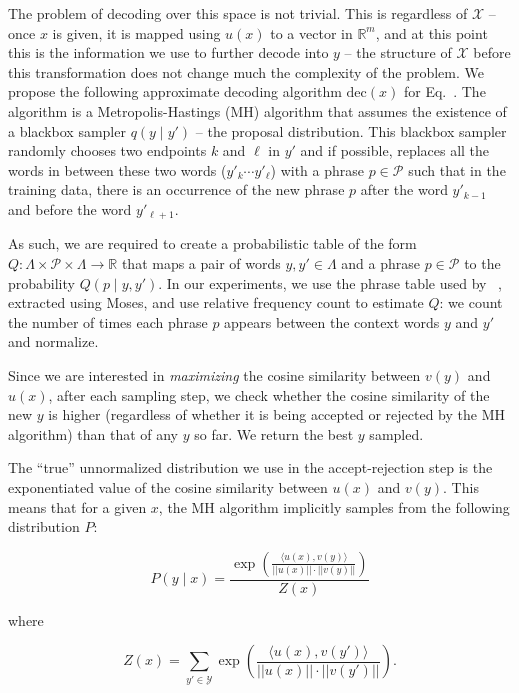 \documentclass[letterpaper]{article}
\newcommand{\inx}{\mathcal{X}}
\newcommand{\outy}{\mathcal{Y}}
\newcommand{\phrasetable}{\mathcal{P}}
\newcommand{\decoder}{\mathrm{dec}}
\newcommand{\newcite}[1]{\citeauthor{#1}~\shortcite{#1}}
\begin{document}
The problem of decoding over this space is not trivial. This is regardless of $\inx$ -- once $x$ is given, it is mapped
using $u(x)$ to a vector in $\mathbb{R}^m$, and at this point this is the information we use to further decode into $y$ --
the structure of $\inx$ before this transformation does not change much the complexity of the problem.
We propose the following approximate decoding algorithm $\decoder(x)$ for Eq.~. The algorithm is a Metropolis-Hastings (MH) algorithm that assumes
the existence of a blackbox sampler $q(y \mid y')$ -- the proposal distribution. This blackbox sampler randomly chooses two endpoints $k$ and $\ell$ in $y'$ and if possible,
replaces all the words in between these two words ($y'_k \cdots y'_{\ell}$) with a phrase $p \in \phrasetable$ such that in the training data, there is an occurrence of the new phrase
$p$ after the word $y'_{k-1}$ and before the word $y'_{\ell+1}$.

As such, we are required to create a probabilistic table of the form $Q \colon \Lambda \times \phrasetable \times \Lambda \rightarrow \mathbb{R}$ that
maps a pair of words $y,y' \in \Lambda$ and a phrase $p \in \phrasetable$ to the probability $Q(p \mid y,y')$. In our experiments, we use the phrase
table used by \newcite{ortiz2015learning}, extracted using Moses, and use relative frequency count to estimate $Q$: we count the number of times each
phrase $p$ appears between the context words $y$ and $y'$ and normalize.

Since we are interested in {\em maximizing} the cosine similarity between $v(y)$ and $u(x)$, after each sampling step, we check whether
the cosine similarity of the new $y$ is higher (regardless of whether it is being accepted or rejected by the MH algorithm) than that of any $y$ so far.
We return the best $y$ sampled.

The ``true'' unnormalized distribution we use in the accept-rejection step is the exponentiated value of the cosine similarity between $u(x)$ and $v(y)$.
This means that for a given $x$, the MH algorithm implicitly samples from the following distribution $P$:

\begin{equation}
P(y \mid x) = \frac{\exp\left(\displaystyle\frac{\langle u(x), v(y) \rangle}{||u(x)|| \cdot || v(y)||}\right)}{Z(x)} \label{eq:a}
\end{equation}

\noindent where

\begin{equation}
Z(x) = \sum_{y' \in \outy} \exp\left(\displaystyle\frac{\langle u(x), v(y') \rangle}{||u(x)|| \cdot || v(y')||}\right).
\end{equation}
\end{document}
